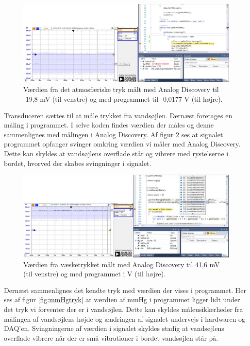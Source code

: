 \begin{figure}[H]
	\centering
	\includegraphics[width=1.2\textwidth]{Figurer/Test/Nulpunkt}
	\caption{Værdien fra det atmosfæriske tryk målt med Analog Discovery til -19,8 mV (til venstre) og med programmet til -0,0177 V (til højre).}
	\label{fig:Atmosfaerisktryk}
\end{figure}

Transduceren sættes til at måle trykket fra vandsøjlen. Dernæst foretages en måling i programmet. I selve koden findes værdien der måles og denne sammenlignes med målingen i Analog Discovery. Af figur \ref{fig:Vaesketryk2} ses at signalet programmet opfanger svinger omkring værdien vi måler med Analog Discovery. Dette kan skyldes at vandsøjlens overflade står og vibrere med rystelserne i bordet, hvorved der skabes svingninger i signalet.

\begin{figure}[H]
	\centering
	\includegraphics[width=1.1\textwidth]{Figurer/Test/Vandsoejle}
	\caption{Værdien fra væsketrykket målt med Analog Discovery til 41,6 mV (til venstre) og med programmet i V (til højre).}
	\label{fig:Vaesketryk2}
\end{figure}

Dernæst sammenlignes det kendte tryk med værdien der vises i programmet. Her ses af figur \ref{fig:mmHgtryk} at værdien af mmHg i programmet ligger lidt under det tryk vi forventer der er i vandsøjlen. Dette kan skyldes måleusikkerheder fra målingen af vandsøjlens højde og ændringen af signalet undervejs i hardwaren og DAQ’en. Svingningerne af værdien i signalet skyldes stadig at vandsøjlens overflade vibrere når der er små vibrationer i bordet vandsøjlen står på.  

